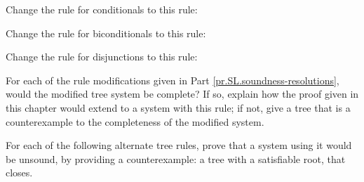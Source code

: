 \begin{earg}
\item Change the rule for conditionals to this rule:

\item Change the rule for biconditionals to this rule:

\item Change the rule for disjunctions to this rule:

\end{earg}

\problempart
\label{pr.SL.completenessresolutions}
For each of the rule modifications given in Part \ref{pr.SL.soundness-resolutions}, would the modified tree system be complete? If so, explain how the proof given in this chapter would extend to a system with this rule; if not, give a tree that is a counterexample to the completeness of the modified system.


\problempart
\label{pr.SL.soundnesscounterexamples}
For each of the following alternate tree rules, prove that a system using it would be unsound, by providing a counterexample: a tree with a satisfiable root, that closes.

